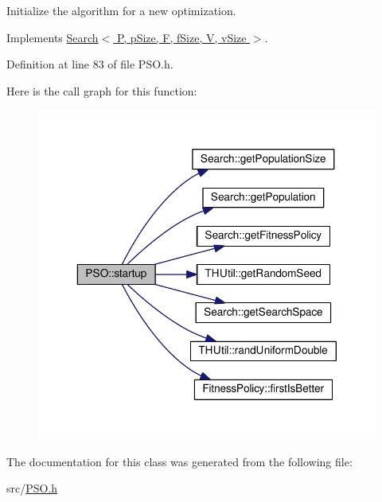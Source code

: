 Initialize the algorithm for a new optimization. 



Implements \hyperlink{classSearch_afe8c2a6dd96ad12f77de7c8226a76028}{Search$<$ P, p\+Size, F, f\+Size, V, v\+Size $>$}.



Definition at line 83 of file P\+S\+O.\+h.



Here is the call graph for this function\+:\nopagebreak
\begin{figure}[H]
\begin{center}
\leavevmode
\includegraphics[width=343pt]{classPSO_a8fb3e9a46396074cbbdc2d04a83783a5_cgraph}
\end{center}
\end{figure}




The documentation for this class was generated from the following file\+:\begin{DoxyCompactItemize}
\item 
src/\hyperlink{PSO_8h}{P\+S\+O.\+h}\end{DoxyCompactItemize}
